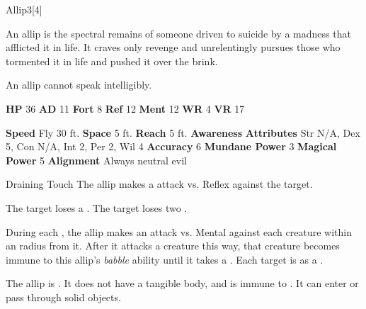       
  \begin{monsection}{Allip}{3}[4]
    \vspace{-1em}\vspace{-1em}
    \vspace{0em}

    
      An allip is the spectral remains of someone driven to suicide by a madness that afflicted it in life.
      It craves only revenge and unrelentingly pursues those who tormented it in life and pushed it over the brink.

      An allip cannot speak intelligibly.
    
    

    \begin{spellcontent}
      \begin{spelltargetinginfo}
        \pari \textbf{HP} 36 \monsep
          \textbf{AD} 11 \monsep
          \textbf{Fort} 8 \monsep
          \textbf{Ref} 12 \monsep
          \textbf{Ment} 12
        \pari \textbf{WR} 4 \monsep
        \textbf{VR} 17
        
      \end{spelltargetinginfo}
    \end{spellcontent}
    \begin{monsterfooter}
      \pari \textbf{Speed} Fly 30 ft. \monsep
        \textbf{Space} 5 ft. \monsep
        \textbf{Reach} 5 ft.
      \pari \textbf{Awareness} 
      \pari \textbf{Attributes}
        Str N/A, Dex 5,
        Con N/A, Int 2,
        Per 2, Wil 4
      \pari \textbf{Accuracy} 6 \monsep
        \textbf{Mundane Power} 3 \monsep
      \textbf{Magical Power} 5
      \pari \textbf{Alignment} Always neutral evil
    \end{monsterfooter}
  \end{monsection}
  \begin{freeability}{Draining Touch}
       The allip makes a  attack
        vs. Reflex against the target.
    
    \hit The target loses a .
    \crit The target loses two .
    \end{freeability}
  
          During each , the allip makes an attack vs. Mental against each creature
          within an \arealarge radius  from it.
          After it attacks a creature this way, that creature becomes immune to this allip's \textit{babble} ability until it takes a .
          \hit Each target is  as a .
        
      The allip is .
      It does not have a tangible body, and is immune to .
      It can enter or pass through solid objects.
  
